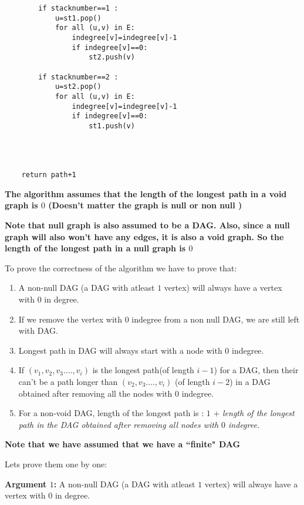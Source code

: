\documentclass[answers]{exam}
\begin{document}
\begin{questions}
\begin{solution}
\begin{verbatim}
        if stacknumber==1 :
            u=st1.pop()
            for all (u,v) in E:
                indegree[v]=indegree[v]-1
                if indegree[v]==0:
                    st2.push(v)
    
        if stacknumber==2 :
            u=st2.pop()
            for all (u,v) in E:
                indegree[v]=indegree[v]-1
                if indegree[v]==0:
                    st1.push(v)


    

    return path+1
\end{verbatim}
\textbf{The algorithm assumes that the length of the longest path in a void graph is $0$ (Doesn't matter the graph is null or non null )}\par
\textbf{Note that null graph is also assumed to be a DAG. Also, since a null graph will also won't have any edges, it is also a void graph. So the length of the longest path in a null graph is $0$}\par

To prove the correctness of the algorithm we have to prove that:

\begin{enumerate}
    \item A non-null DAG (a DAG with atleast $1$ vertex) will always have a vertex with $0$ in degree.
    \item If we remove the vertex with $0$ indegree from a non null DAG, we are still left with DAG.
    \item Longest path in DAG will always start with a node with $0$ indegree.
    \item If $(v_1,v_2,v_3....,v_i)$ is the longest path(of length $i-1$) for a DAG, then their can't be a path longer than $(v_2,v_3....,v_i)$ (of length $i-2$)  in a DAG obtained after removing all the nodes with $0$ indegree.
    \item For a non-void DAG, length of the longest path is : $1$ $+$ \textit{length of the longest path in the DAG obtained after removing all nodes with $0$ indegree.}    
\end{enumerate}


\textbf{Note that we have assumed that we have a ``finite" DAG}\par

Lets prove them one by one:

\textbf{Argument $1$:} A non-null DAG (a DAG with atleast $1$ vertex) will always have a vertex with $0$ in degree.\par


\end{solution}
\end{questions}
\end{document}
